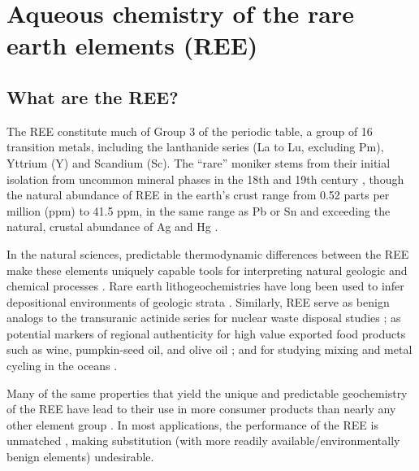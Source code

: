 \chapter{Aqueous chemistry of the rare earth elements (REE)}\label{chap:REE_aq_chem}

\section{What are the REE?}

The REE constitute much of Group 3 of the periodic table, a group of 16 transition metals, including the lanthanide series (La to Lu, excluding Pm), Yttrium (Y) and Scandium (Sc).
The ``rare'' moniker stems from their initial isolation from uncommon mineral phases in the 18th and 19th century \citep{CastorHedrick}, though the natural abundance of REE in the earth's crust range from 0.52 parts per million (ppm) to 41.5 ppm, in the same range as Pb or Sn and exceeding the natural, crustal abundance of Ag and Hg \citep{CRC}.

In the natural sciences, predictable thermodynamic differences between the REE make these elements uniquely capable tools for interpreting natural geologic and chemical processes \citep{Murray_Geol_1990, Laveuf_Geoderma_2009}.
Rare earth lithogeochemistries have long been used to infer depositional environments of geologic strata \citep{Murray_Geol_1990, PAAS, Hanson_AREPS_1980}.
Similarly, REE serve as benign analogs to the transuranic actinide series for nuclear waste disposal studies \citep{Krauskopf_CG_1986, Millero_GCA_1992};
as potential markers of regional authenticity for high value exported food products such as wine, pumpkin-seed oil, and olive oil \citep{Jakubowski_FJAC_1999, Joebstl_FC_2010, Farmaki_AL_2012};
and for studying mixing and metal cycling in the oceans \citep{DeBaar_Nature_1983, Elderfield_PTRS_1988}.

Many of the same properties that yield the unique and predictable geochemistry of the REE have lead to their use in more consumer products than nearly any other element group \citep{CastorHedrick, Graedel_PNAS_2015a}. In most applications, the performance of the REE is unmatched \citep{Ciacci_EST_2015, Nassar_JIE_2015}, making substitution (with more readily available/environmentally benign elements) undesirable.

